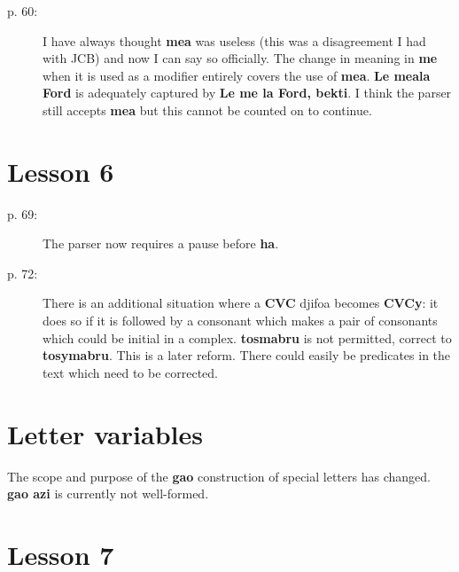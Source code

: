 \documentclass[12pt]{article}
\begin{document}
\begin{description}

\item[p. 60:]  I have always thought {\bf mea} was useless (this was a disagreement I had with JCB) and now I can say so officially.  The change in meaning in {\bf me} when it is used as a modifier entirely covers the use of {\bf mea}.  {\bf Le meala Ford} is adequately captured by {\bf Le me la Ford, bekti}.  I think the parser still accepts {\bf mea} but this cannot be counted on to continue.

\end{description}

\section{Lesson 6}

\begin{description}

\item[p. 69:]  The parser now requires a pause before {\bf ha}.

\item[p. 72:]  There is an additional situation where a {\bf CVC} djifoa becomes {\bf CVCy}: it does so if it is followed by a consonant which makes a pair of consonants which could be initial in a complex.  {\bf tosmabru} is not permitted, correct to {\bf tosymabru}.  This is a later reform.  There could easily be predicates in the text which need to be corrected.

\end{description}

\section{Letter variables}

The scope and purpose of the {\bf gao} construction of special letters has changed.  {\bf gao azi} is currently not
well-formed.

\section{Lesson 7}
\end{document}
